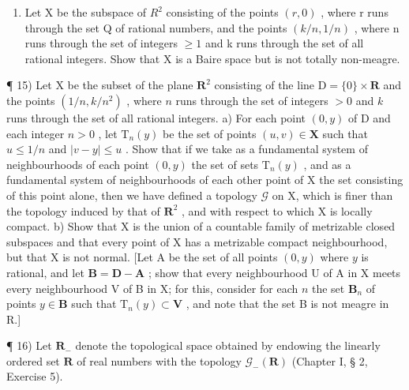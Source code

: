 \begin{enumerate}
\def\labelenumi{\arabic{enumi})}
\setcounter{enumi}{13}
\tightlist
\item
  Let X be the subspace of \(R^{2}\) consisting of the points \((r,0)\) , where r runs through the set Q of rational numbers, and the points \((k/n,1/n)\) , where n runs through the set of integers \(\geqslant 1\) and k runs through the set of all rational integers. Show that X is a Baire space but is not totally non-meagre.
\end{enumerate}

¶ 15) Let X be the subset of the plane \(\mathbf{R}^2\) consisting of the line \(\mathrm{D} = \{0\} \times \mathbf{R}\) and the points \((1/n, k/n^2)\) , where \(n\) runs through the set of integers \(>0\) and \(k\) runs through the set of all rational integers. a) For each point \((0, y)\) of D and each integer \(n > 0\) , let \(\mathrm{T}_n(y)\) be the set of points \((u, v) \in \mathbf{X}\) such that \(u \leqslant 1/n\) and \(|v - y| \leqslant u\) . Show that if we take as a fundamental system of neighbourhoods of each point \((0, y)\) the set of sets \(\mathrm{T}_n(y)\) , and as a fundamental system of neighbourhoods of each other point of X the set consisting of this point alone, then we have defined a topology \(\mathcal{G}\) on X, which is finer than the topology induced by that of \(\mathbf{R}^2\) , and with respect to which X is locally compact. b) Show that X is the union of a countable family of metrizable closed subspaces and that every point of X has a metrizable compact neighbourhood, but that X is not normal. {[}Let A be the set of all points \((0, y)\) where \(y\) is rational, and let \(\mathbf{B} = \mathbf{D} - \mathbf{A}\) ; show that every neighbourhood U of A in X meets every neighbourhood V of B in X; for this, consider for each \(n\) the set \(\mathbf{B}_n\) of points \(y \in \mathbf{B}\) such that \(\mathrm{T}_n(y) \subset \mathbf{V}\) , and note that the set B is not meagre in R.{]}

¶ 16) Let \(\mathbf{R}_{-}\) denote the topological space obtained by endowing the linearly ordered set \(\mathbf{R}\) of real numbers with the topology \(\mathcal{G}_{-}(\mathbf{R})\) (Chapter I, § 2, Exercise 5).

